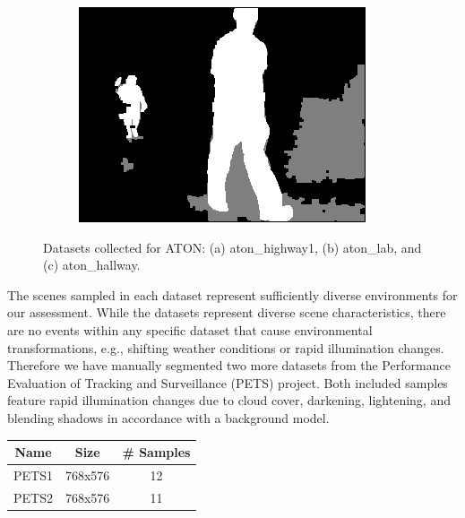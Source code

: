 \documentclass[12pt]{report}
\begin{document}
\begin{figure}
\begin{subfigure}{.3\linewidth}
  \caption{}
  \label{fig:sub5}
\end{subfigure}
\hfill
\begin{subfigure}{.3\linewidth}
  \includegraphics[width=1\linewidth]{figures/hallway_gt_0164.jpg}
  \caption{}
  \label{fig:sub6}
\end{subfigure}

\caption{Datasets collected for ATON: (a) aton\_highway1, (b) aton\_lab, and (c) aton\_hallway.}
\label{fig:datasets}
\end{figure}

The scenes sampled in each dataset represent sufficiently diverse environments for our assessment. While the datasets represent diverse scene characteristics, there are no events within any specific dataset that cause environmental transformations, e.g., shifting weather conditions or rapid illumination changes. Therefore we have manually segmented two more datasets from the Performance Evaluation of Tracking and Surveillance (PETS) project. Both included samples feature rapid illumination changes due to cloud cover, darkening, lightening, and blending shadows in accordance with a background model.

\begin{center}
\begin{tabular}{ |c|c|c| }
	\hline
	\textbf{Name} & \textbf{Size} & \textbf{\# Samples} \\
	\hline
	\hline
	PETS1 & 768x576 & 12 \\
	\hline
	PETS2 & 768x576 & 11 \\
	\hline
\end{tabular}
\end{center}
\end{document}
